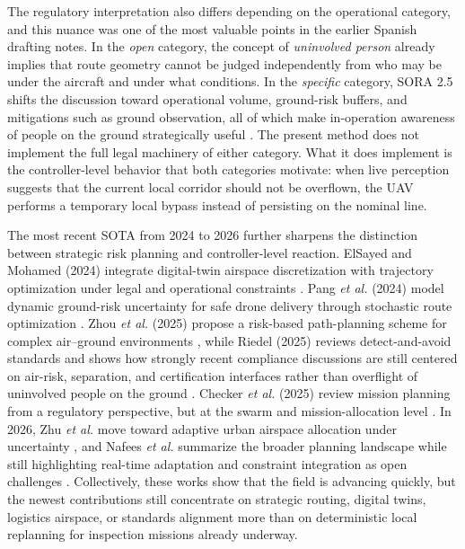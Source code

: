 \documentclass[a4paper,11pt]{article}
\begin{document}
The regulatory interpretation also differs depending on the operational category, and this nuance was one of the most valuable points in the earlier Spanish drafting notes. In the \emph{open} category, the concept of \emph{uninvolved person} already implies that route geometry cannot be judged independently from who may be under the aircraft and under what conditions. In the \emph{specific} category, SORA 2.5 shifts the discussion toward operational volume, ground-risk buffers, and mitigations such as ground observation, all of which make in-operation awareness of people on the ground strategically useful \cite{EU2019_947,JARUS_SORA_2_5_2024,EASA_AMC_GM_SORA25_2025}. The present method does not implement the full legal machinery of either category. What it does implement is the controller-level behavior that both categories motivate: when live perception suggests that the current local corridor should not be overflown, the UAV performs a temporary local bypass instead of persisting on the nominal line.

The most recent SOTA from 2024 to 2026 further sharpens the distinction between strategic risk planning and controller-level reaction. ElSayed and Mohamed (2024) integrate digital-twin airspace discretization with trajectory optimization under legal and operational constraints \cite{elsayed2024digitaltwin}. Pang \emph{et al.} (2024) model dynamic ground-risk uncertainty for safe drone delivery through stochastic route optimization \cite{pang2024stochastic}. Zhou \emph{et al.} (2025) propose a risk-based path-planning scheme for complex air--ground environments \cite{zhou2025riskbased}, while Riedel (2025) reviews detect-and-avoid standards and shows how strongly recent compliance discussions are still centered on air-risk, separation, and certification interfaces rather than overflight of uninvolved people on the ground \cite{riedel2025daa}. Checker \emph{et al.} (2025) review mission planning from a regulatory perspective, but at the swarm and mission-allocation level \cite{checker2025regulatory}. In 2026, Zhu \emph{et al.} move toward adaptive urban airspace allocation under uncertainty \cite{zhu2026adaptive}, and Nafees \emph{et al.} summarize the broader planning landscape while still highlighting real-time adaptation and constraint integration as open challenges \cite{nafees2026review}. Collectively, these works show that the field is advancing quickly, but the newest contributions still concentrate on strategic routing, digital twins, logistics airspace, or standards alignment more than on deterministic local replanning for inspection missions already underway.
\end{document}
